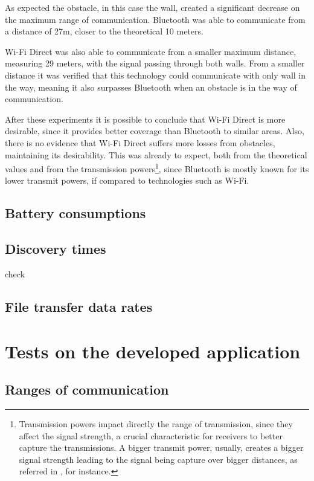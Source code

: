 As expected the obstacle, in this case the wall, created a significant decrease on the maximum range of communication. Bluetooth was able to communicate from a distance of 27m, closer to the theoretical 10 meters.

Wi-Fi Direct was also able to communicate from a smaller maximum distance, measuring 29 meters, with the signal passing through both walls. From a smaller distance it was verified that this technology could communicate with only wall in the way, meaning it also surpasses Bluetooth when an obstacle is in the way of communication.

After these experiments it is possible to conclude that Wi-Fi Direct is more desirable, since it provides better coverage than Bluetooth to similar areas. Also, there is no evidence that Wi-Fi Direct suffers more losses from obstacles, maintaining its desirability. This was already to expect, both from the theoretical values and from the transmission powers\footnote{Transmission powers impact directly the range of transmission, since they affect the signal strength, a crucial characteristic for receivers to better capture the transmissions. A bigger transmit power, usually, creates a bigger signal strength leading to the signal being capture over bigger distances, as referred in \cite{txpower}, for instance.}, since Bluetooth is mostly known for its lower transmit powers, if compared to technologies such as Wi-Fi.

\subsection{Battery consumptions}

\subsection{Discovery times}

check

\subsection{File transfer data rates}
\label{subsec:ftdr}



\section{Tests on the developed application}

\subsection{Ranges of communication}

